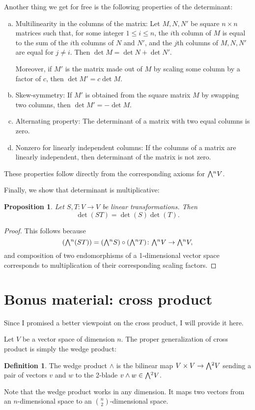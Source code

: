 \documentclass[11pt,oneside]{amsart}
\theoremstyle{definition}
\newtheorem{definition}{Definition}
\theoremstyle{plain}
\newtheorem{proposition}{Proposition}
\newcommand{\extp}{\mathchoice{{\textstyle\bigwedge}}%
    {{\bigwedge}}%
    {{\textstyle\wedge}}%
    {{\scriptstyle\wedge}}}
\begin{document}
Another thing we get for free is the following properties of the determinant:
\begin{enumerate}[(a)]
    \item Multilinearity in the columns of the matrix: Let $M, N,N'$ be square $n\times n$ matrices such that, for some integer $1\leq i\leq n$, the $i$th column of $M$ is equal to the sum of the $i$th columns of $N$ and $N'$, and the $j$th columns of $M,N,N'$ are equal for $j\neq i$. Then $\det M=\det N+\det N'$.
    
    Moreover, if $M'$ is the matrix made out of $M$ by scaling some column by a factor of $c$, then $\det M'=c\det M$.
    \item Skew-symmetry: If $M'$ is obtained from the square matrix $M$ by swapping two columns, then $\det M'=-\det M$.
    \item Alternating property: The determinant of a matrix with two equal columns is zero.
    \item Nonzero for linearly independent columns: If the columns of a matrix are linearly independent, then determinant of the matrix is not zero.
\end{enumerate}
These properties follow directly from the corresponding axioms for $\extp^n V$.

Finally, we show that determinant is multiplicative:
\begin{proposition}
    Let $S,T\colon V\to V$ be linear transformations. Then
    \[\det(ST)=\det(S)\det(T).\]
\end{proposition}
\begin{proof}
    This follows because
    \[(\extp^n (ST))=(\extp^n S)\circ (\extp^n T)\colon \extp^n V\to\extp^n V,\]
    and composition of two endomorphisms of a 1-dimensional vector space corresponds to multiplication of their corresponding scaling factors.
\end{proof}

\section{Bonus material: cross product}
Since I promised a better viewpoint on the cross product, I will provide it here.

Let $V$ be a vector space of dimension $n$. The proper generalization of cross product is simply the wedge product:
\begin{definition}
    The wedge product $\wedge$ is the bilinear map $V\times V\to \extp^2 V$ sending a pair of vectors $v$ and $w$ to the 2-blade $v\wedge w\in\extp^2 V$.
\end{definition}
Note that the wedge product works in any dimension. It maps two vectors from an $n$-dimensional space to an $\binom n2$-dimensional space.
\end{document}

